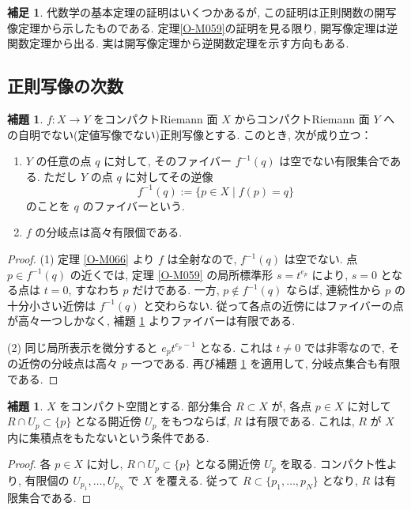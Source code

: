 \documentclass[dvipdfmx,a4paper,11pt]{article} %
\theoremstyle{definition}
\numberwithin{equation}{section}
\newtheorem{lem}[thm]{補題}
\newtheorem{rem}[thm]{補足}
\begin{document}
\begin{rem}
代数学の基本定理の証明はいくつかあるが, この証明は正則関数の開写像定理から示したものである. 
定理\ref{O-M059}の証明を見る限り, 開写像定理は逆関数定理から出る. 実は開写像定理から逆関数定理を示す方向もある. 
\end{rem}


\subsection{正則写像の次数}\label{sec-degree-holomorphic-map}

\begin{lem}\label{O-M070}
$f:X\to Y$ をコンパクトRiemann 面 $X$ からコンパクトRiemann 面 $Y$ への自明でない(定値写像でない)正則写像とする. このとき, 次が成り立つ：
\begin{enumerate}
\item
$Y$ の任意の点 $q$ に対して, そのファイバー $f^{-1}(q)$ は空でない有限集合である.
ただし $Y$ の点 $q$ に対してその逆像
\[
f^{-1}(q):=\{p\in X\mid f(p)=q\}
\]
のことを $q$ のファイバーという.
\item
$f$ の分岐点は高々有限個である.
\end{enumerate}
\end{lem}

\begin{proof}
(1) 定理 \ref{O-M066} より $f$ は全射なので, $f^{-1}(q)$ は空でない.
点 $p\in f^{-1}(q)$ の近くでは, 定理 \ref{O-M059} の局所標準形
$s=t^{e_p}$ により, $s=0$ となる点は $t=0$, すなわち $p$ だけである.
一方, $p\notin f^{-1}(q)$ ならば, 連続性から
$p$ の十分小さい近傍は $f^{-1}(q)$ と交わらない.
従って各点の近傍にはファイバーの点が高々一つしかなく,
補題 \ref{O-M063} よりファイバーは有限である.

(2) 同じ局所表示を微分すると $e_p t^{e_p-1}$ となる.
これは $t\neq0$ では非零なので, その近傍の分岐点は高々 $p$ 一つである.
再び補題 \ref{O-M063} を適用して, 分岐点集合も有限である.
\end{proof}
\begin{lem}\label{O-M063}
$X$ をコンパクト空間とする.
部分集合 $R\subset X$ が, 各点 $p\in X$ に対して
$R\cap U_p\subset\{p\}$ となる開近傍 $U_p$ をもつならば, $R$ は有限である.
これは, $R$ が $X$ 内に集積点をもたないという条件である.
\end{lem}
\begin{proof}
各 $p\in X$ に対し, $R\cap U_p\subset\{p\}$ となる開近傍 $U_p$ を取る.
コンパクト性より, 有限個の $U_{p_1},\ldots,U_{p_N}$ で $X$ を覆える.
従って $R\subset\{p_1,\ldots,p_N\}$ となり, $R$ は有限集合である.
\end{proof}
\end{document}
